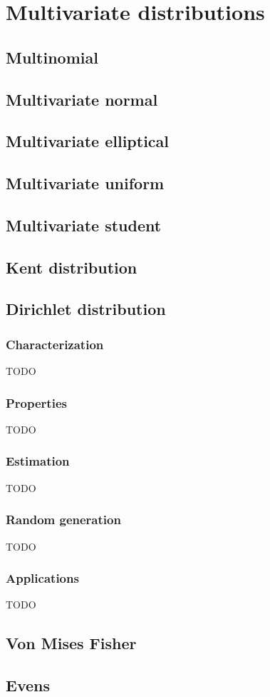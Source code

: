 \chapter{Multivariate distributions}

\section{Multinomial}
\section{Multivariate normal}
\section{Multivariate elliptical}
\section{Multivariate uniform}
\section{Multivariate student}
\section{Kent distribution}

\section{Dirichlet distribution}
\subsection{Characterization}
TODO
\subsection{Properties}
TODO
\subsection{Estimation}
TODO
\subsection{Random generation}
TODO
\subsection{Applications}
TODO

\section{Von Mises Fisher}
\section{Evens}